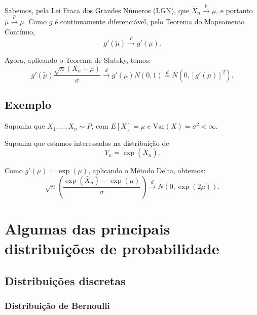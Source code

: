 \documentclass[
  letterpaper,
  DIV=11,
  numbers=noendperiod]{scrreprt}
\begin{document}
Sabemos, pela Lei Fraca dos Grandes Números (LGN), que
\(\bar{X}_n \xrightarrow{p} \mu\), e portanto
\(\tilde{\mu} \xrightarrow{p} \mu\). Como \(g\) é continuamente
diferenciável, pelo Teorema do Mapeamento Contínuo,
\[g'(\tilde{\mu}) \xrightarrow{p} g'(\mu).\]

Agora, aplicando o Teorema de Slutsky, temos:
\[g'(\tilde{\mu})\frac{\sqrt{n}(X_n - \mu)}{\sigma}
\xrightarrow{d}
g'(\mu)N(0,1)
\overset{d}{=} N\left(0, [g'(\mu)]^2\right).\]

\subsection*{Exemplo}\label{exemplo}

Suponha que \(X_1, \dots, X_n \sim P\), com \(E[X] = \mu\) e
\(\mathrm{Var}(X) = \sigma^2 < \infty\).

Suponha que estamos interessados na distribuição de
\[Y_n = \exp(\bar{X}_n).\]

Como \(g'(\mu) = \exp(\mu)\), aplicando o Método Delta, obtemos:
\[\sqrt{n}\left(\frac{\exp(\bar{X}_n) - \exp(\mu)}{\sigma}\right)
\xrightarrow{d}
N\left(0, \exp(2\mu)\right).\]

\section{Algumas das principais distribuições de
probabilidade}\label{algumas-das-principais-distribuiuxe7uxf5es-de-probabilidade}

\subsection{Distribuições
discretas}\label{distribuiuxe7uxf5es-discretas}

\subsubsection*{Distribuição de
Bernoulli}\label{distribuiuxe7uxe3o-de-bernoulli}
\end{document}
